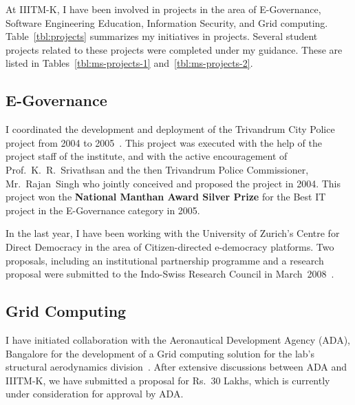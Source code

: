 \documentclass[titlepage, %
11pt, 
]{article}
\newcommand{\achievement}[1]{\textcolor{OliveGreen}{\bf #1}}
\begin{document}
At IIITM-K, I have been involved in projects in the area of
E-Governance, Software Engineering Education, Information
Security, and Grid computing.  Table~\ref{tbl:projects}
summarizes my initiatives in projects.  Several student
projects related to these projects were completed under my
guidance.  These are listed in
Tables~\ref{tbl:ms-projects-1} and~\ref{tbl:ms-projects-2}.

\subsection{E-Governance}
\label{subsec:egov}
I coordinated the development and deployment of the
Trivandrum City Police project from 2004 to
2005~\cite{tvm-city-portal-2005}.  This project was executed
with the help of the project staff of the institute, and
with the active encouragement of Prof.~K.~R.~Srivathsan and
the then Trivandrum Police Commissioner, Mr.~Rajan~Singh who
jointly conceived and proposed the project in 2004.  This
project won the \achievement{National Manthan Award Silver Prize}
for the Best IT project in the E-Governance category in
2005.

In the last year, I have been working with the University of
Zurich's Centre for Direct Democracy in the area of
Citizen-directed e-democracy platforms.  Two proposals,
including an institutional partnership programme and a
research proposal were submitted to the Indo-Swiss Research
Council in
March~2008~\cite{indo-swiss-jrp-2008,indo-swiss-ipp-2008}.


\subsection{Grid Computing}
\label{subsec:grid}

I have initiated collaboration with the Aeronautical
Development Agency (ADA), Bangalore for the development of a
Grid computing solution for the lab's structural
aerodynamics division~\cite{ada-proposal-2007}.  After
extensive discussions between ADA and IIITM-K, we have
submitted a proposal for Rs.~30 Lakhs, which is currently
under consideration for approval by ADA.
\end{document}
